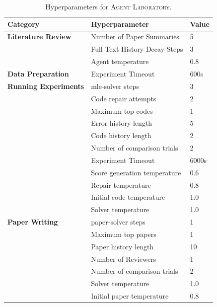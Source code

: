\documentclass[11pt, a4paper]{include/gdm_format}
\begin{document}
\begin{table}[h!]
\centering
\caption{Hyperparameters for \textsc{Agent Laboratory}.}
\begin{tabular}{@{}lll@{}}
\toprule
\textbf{Category}        & \textbf{Hyperparameter}                          & \textbf{Value}       \\ \midrule
\textbf{Literature Review} & Number of Paper Summaries                       & 5                    \\
& Full Text History Decay Steps & 3                   \\ 
& Agent temperature          & 0.8                    \\ \midrule
\textbf{Data Preparation} & 
 Experiment Timeout                               & 600s         \\ \midrule
\textbf{Running Experiments}   & mle-solver steps     & 3 \\
& Code repair attempts   & 2  \\ 
& Maximum top codes      & 1                    \\ 
& Error history length          & 5                    \\ 
& Code history length          & 2                    \\ 
& Number of comparison trials          & 2                    \\ 
& Experiment Timeout                               & 6000s         \\
& Score generation temperature          & 0.6                    \\ 
& Repair temperature          & 0.8                    \\ 
& Initial code temperature          & 1.0                    \\ 
& Solver temperature          & 1.0                    \\ \midrule
\textbf{Paper Writing}        & paper-solver steps                            & 1 \\        & Maximum top papers                            & 1                    \\
& Paper history length                       & 10                    \\
& Number of Reviewers                      & 1                    \\
& Number of comparison trials                                  & 2                  \\ 
& Solver temperature          & 1.0                    \\ 
& Initial paper temperature          & 0.8                    \\ \bottomrule
\end{tabular}
\end{table}
\end{document}
